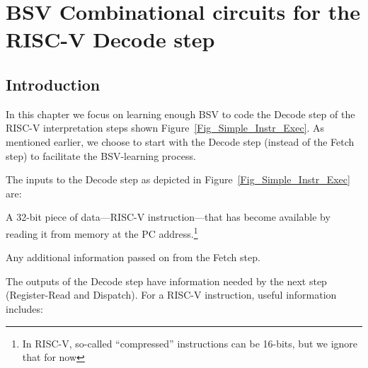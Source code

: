 

\chapter{BSV Combinational circuits for the RISC-V Decode step}


\setcounter{page}{1}
\renewcommand{\thepage}{\arabic{chapter}-\arabic{page}}

\label{ch_Combo_Circuits}


\section{Introduction}

In this chapter we focus on learning enough BSV to code the Decode
step of the RISC-V interpretation steps shown
Figure~\ref{Fig_Simple_Instr_Exec}.  As mentioned earlier, we choose
to start with the Decode step (instead of the Fetch step) to
facilitate the BSV-learning process.

The inputs to the Decode step as depicted in
Figure~\ref{Fig_Simple_Instr_Exec} are:

\begin{tightlist}

 \item A 32-bit piece of data---RISC-V instruction---that has become
 available by reading it from memory at the PC address.\footnote{In
 RISC-V, so-called ``compressed'' instructions can be 16-bits, but we
 ignore that for now}

 \item Any additional information passed on from the Fetch step.

\end{tightlist}

The outputs of the Decode step have information needed by the next
step (Register-Read and Dispatch).  For a RISC-V instruction, useful
information includes:

